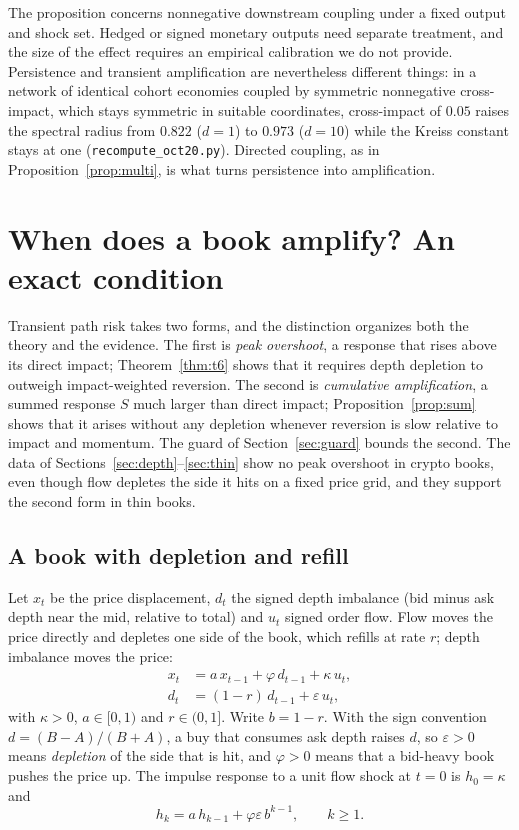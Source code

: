 \documentclass[12pt]{article}
\theoremstyle{definition}
\theoremstyle{remark}
\begin{document}
The proposition concerns nonnegative downstream coupling under a fixed output and shock set. Hedged or signed monetary outputs need separate treatment, and the size of the effect requires an empirical calibration we do not provide. Persistence and transient amplification are nevertheless different things: in a network of identical cohort economies coupled by symmetric nonnegative cross-impact, which stays symmetric in suitable coordinates, cross-impact of $0.05$ raises the spectral radius from $0.822$ ($d=1$) to $0.973$ ($d=10$) while the Kreiss constant stays at one (\texttt{recompute\_oct20.py}). Directed coupling, as in Proposition~\ref{prop:multi}, is what turns persistence into amplification.
\section{When does a book amplify? An exact condition}\label{sec:t6}

Transient path risk takes two forms, and the distinction organizes both the theory and the evidence. The first is \emph{peak overshoot}, a response that rises above its direct impact; Theorem~\ref{thm:t6} shows that it requires depth depletion to outweigh impact-weighted reversion. The second is \emph{cumulative amplification}, a summed response $S$ much larger than direct impact; Proposition~\ref{prop:sum} shows that it arises without any depletion whenever reversion is slow relative to impact and momentum. The guard of Section~\ref{sec:guard} bounds the second. The data of Sections~\ref{sec:depth}--\ref{sec:thin} show no peak overshoot in crypto books, even though flow depletes the side it hits on a fixed price grid, and they support the second form in thin books.

\subsection{A book with depletion and refill}
Let $x_t$ be the price displacement, $d_t$ the signed depth imbalance (bid minus ask depth near the mid, relative to total) and $u_t$ signed order flow. Flow moves the price directly and depletes one side of the book, which refills at rate $r$; depth imbalance moves the price:
\begin{align}
x_t &= a\,x_{t-1} + \varphi\,d_{t-1} + \kappa\,u_t, \label{eq:x}\\
d_t &= (1-r)\,d_{t-1} + \varepsilon\,u_t, \label{eq:d}
\end{align}
with $\kappa>0$, $a\in[0,1)$ and $r\in(0,1]$. Write $b=1-r$. With the sign convention $d=(B-A)/(B+A)$, a buy that consumes ask depth raises $d$, so $\varepsilon>0$ means \emph{depletion} of the side that is hit, and $\varphi>0$ means that a bid-heavy book pushes the price up. The impulse response to a unit flow shock at $t=0$ is $h_0=\kappa$ and
\begin{equation}\label{eq:rec}
h_k=a\,h_{k-1}+\varphi\varepsilon\,b^{k-1},\qquad k\ge1.
\end{equation}
\end{document}
